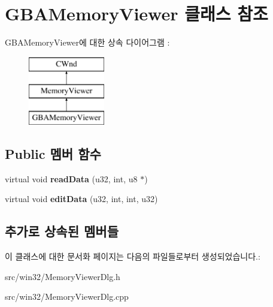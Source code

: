 \hypertarget{class_g_b_a_memory_viewer}{}\section{G\+B\+A\+Memory\+Viewer 클래스 참조}
\label{class_g_b_a_memory_viewer}
G\+B\+A\+Memory\+Viewer에 대한 상속 다이어그램 \+: \begin{figure}[H]
\begin{center}
\leavevmode
\includegraphics[height=3.000000cm]{class_g_b_a_memory_viewer}
\end{center}
\end{figure}
\subsection*{Public 멤버 함수}
\begin{DoxyCompactItemize}
\item 
\mbox{\label{class_g_b_a_memory_viewer_a443f550e4a3a065a0ae3a1142c678e91}} 
virtual void {\bfseries read\+Data} (u32, int, u8 $\ast$)
\item 
\mbox{\label{class_g_b_a_memory_viewer_a6bfb5ccea3b6f87c3b186149538ad709}} 
virtual void {\bfseries edit\+Data} (u32, int, int, u32)
\end{DoxyCompactItemize}
\subsection*{추가로 상속된 멤버들}


이 클래스에 대한 문서화 페이지는 다음의 파일들로부터 생성되었습니다.\+:\begin{DoxyCompactItemize}
\item 
src/win32/Memory\+Viewer\+Dlg.\+h\item 
src/win32/Memory\+Viewer\+Dlg.\+cpp\end{DoxyCompactItemize}
